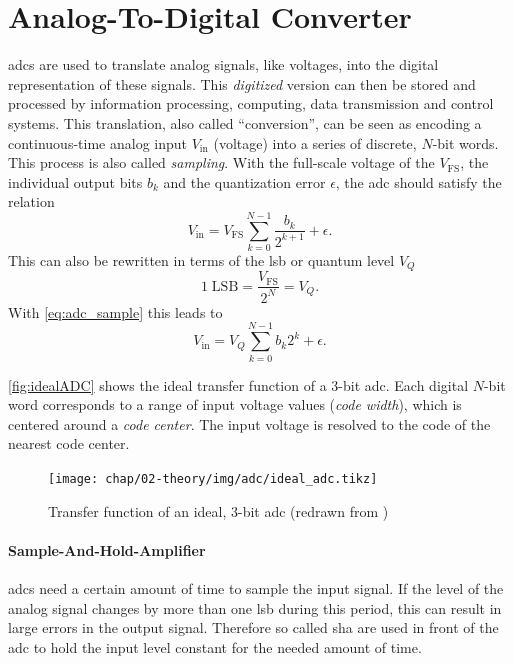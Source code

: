 \section{Analog-To-Digital Converter}
\Glspl{adc} are used to translate analog signals, like voltages, into the digital representation of these signals.
This \textit{digitized} version can then be stored and processed by information processing, computing, data transmission and control systems. 
This translation, also called ``conversion'', can be seen as encoding a continuous-time analog input $V_\text{in}$ (voltage) into a series of discrete, $N$-bit words. %
This process is also called \textit{sampling}. 
With the full-scale voltage of the $V_{\text{FS}}$, the individual output bits $b_k$ and the quantization error $\epsilon$, the \gls{adc} should satisfy the relation
\begin{equation} \label{eq:adc_sample}
	V_{\text{in}} = V_{\text{FS}} \sum_{k = 0}^{N-1} \frac{b_k}{2^{k+1}} + \epsilon.
\end{equation}
This can also be rewritten in terms of the \gls{lsb} or quantum level $V_Q$
\begin{equation}
	1 \; \text{LSB} = \frac{V_\text{FS}}{2^N} = V_Q.
\end{equation}
With \autoref{eq:adc_sample} this leads to 
\begin{equation}
	V_\text{in} = V_Q \sum_{k = 0}^{N-1} b_k 2^{k}  + \epsilon.
\end{equation}

\autoref{fig:idealADC} shows the ideal transfer function of a 3-bit \gls{adc}. 
Each digital $N$-bit word corresponds to a range of input voltage values (\textit{code width}), which is centered around a \textit{code center}.
The input voltage is resolved to the code of the nearest code center.
\begin{figure}[H]
	\centering
	\texttt{[image: chap/02-theory/img/adc/ideal\_adc.tikz]}
	\caption[Transfer function of ideal, 3-bit ADC]{Transfer function of an ideal, 3-bit \gls{adc} (redrawn from \cite{Lundberg})}
	\label{fig:idealADC}
\end{figure}


\paragraph{Sample-And-Hold-Amplifier}
\Glspl{adc} need a certain amount of time to sample the input signal.
If the level of the analog signal changes by more than one \gls{lsb} during this period, this can result in large errors in the output signal.
Therefore so called \gls{sha} are used in front of the \gls{adc} to hold the input level constant for the needed amount of time.

